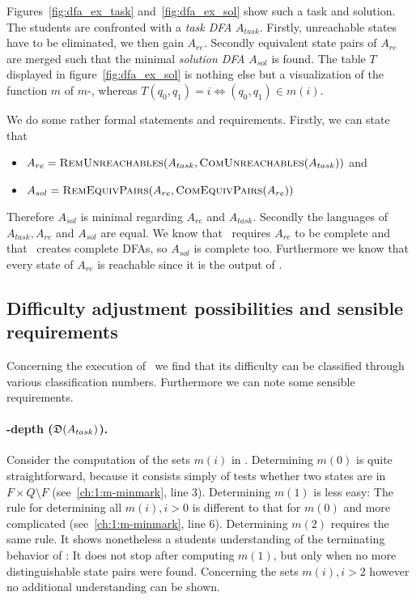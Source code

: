\noindent Figures~\ref{fig:dfa_ex_task} and~\ref{fig:dfa_ex_sol} show such a task and solution. The students are confronted with a \emph{task DFA} $A_{task}$. Firstly, unreachable states have to be eliminated, we then gain $A_{re}$. Secondly equivalent state pairs of $A_{re}$ are merged such that the minimal \emph{solution DFA} $A_{sol}$ is found. The table $T$ displayed in figure~\ref{fig:dfa_ex_sol} is nothing else but a visualization of the function $m$ of $m$-\CompDist, whereas $T(q_0, q_1) = i \Leftrightarrow (q_0, q_1) \in m(i)$.

We do some rather formal statements and requirements. Firstly, we can state that
\begin{itemize}
	\item $A_{re} = \textsc{RemUnreachables}(A_{task}, \textsc{ComUnreachables}(A_{task}))$ and
	\item $A_{sol} = \textsc{RemEquivPairs}(A_{re}, \textsc{ComEquivPairs}(A_{re}))$
\end{itemize}
Therefore $A_{sol}$ is minimal regarding $A_{re}$ and $A_{task}$. Secondly the languages of $A_{task}, A_{re}$ and $A_{sol}$ are equal. We know that \CompDist\ requires $A_{re}$ to be complete and that \RemEq\ creates complete DFAs, so $A_{sol}$ is complete too. Furthermore we know that every state of $A_{re}$ is reachable since it is the output of \RemUnr.

\subsection{Difficulty adjustment possibilities and sensible requirements}\label{ch:1:requirements-analysis}

Concerning the execution of \MinAlg\ we find that its difficulty can be classified through various classification numbers. Furthermore we can note some sensible requirements.

\paragraph*{\CompDist-depth ($\mathfrak{D}(A_{task})$).}

Consider the computation of the sets $m(i)$ in \CompDist. Determining $m(0)$ is quite straightforward, because it consists simply of tests whether two states are in $F \times Q \setminus F$ (see~\ref{ch:1:m-minmark}, line 3). Determining $m(1)$ is less easy: The rule for determining all $m(i), i > 0$ is different to that for $m(0)$ and more complicated (see~\ref{ch:1:m-minmark}, line 6). Determining $m(2)$ requires the same rule. It shows nonetheless a students understanding of the terminating behavior of \CompDist: It does not stop after computing $m(1)$, but only when no more distinguishable state pairs were found. Concerning the sets $m(i), i > 2$ however no additional understanding can be shown.

